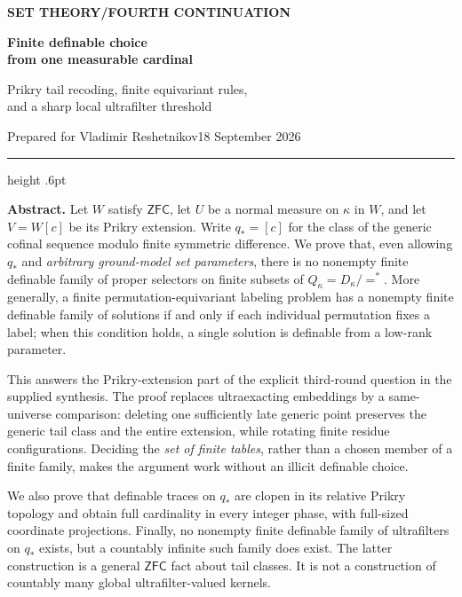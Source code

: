\documentclass[11pt,letterpaper]{article}
\theoremstyle{definition}
\numberwithin{equation}{section}
\newcommand{\ZFC}{\mathsf{ZFC}}
\begin{document}
\thispagestyle{empty}
{\sffamily\bfseries\small\color{Olive}SET THEORY\quad /\quad FOURTH CONTINUATION}

\vspace{13pt}
{\fontsize{28}{31}\selectfont\bfseries\color{Forest}Finite definable choice\\from one measurable cardinal\par}
\vspace{10pt}
{\fontsize{14}{18}\selectfont Prikry tail recoding, finite equivariant rules,\\and a sharp local ultrafilter threshold\par}
\vspace{14pt}
{\color{Muted}Prepared for Vladimir Reshetnikov\hfill 18 September 2026\par}
\vspace{3pt}
{\color{Sage}\hrule height .6pt}
\vspace{12pt}

\textbf{Abstract.}
Let $W$ satisfy $\ZFC$, let $U$ be a normal measure on $\kappa$ in $W$, and let
$V=W[c]$ be its Prikry extension. Write $q_*=[c]$ for the class of the generic
cofinal sequence modulo finite symmetric difference. We prove that, even allowing
$q_*$ and \emph{arbitrary ground-model set parameters}, there is no nonempty
finite definable family of proper selectors on finite subsets of
$Q_\kappa=D_\kappa/{=^*}$. More generally, a finite permutation-equivariant
labeling problem has a nonempty finite definable family of solutions if and
only if each individual permutation fixes a label; when this condition holds,
a single solution is definable from a low-rank parameter.

This answers the Prikry-extension part of the explicit third-round question
in the supplied synthesis. The proof replaces ultraexacting embeddings by a
same-universe comparison: deleting one sufficiently late generic point
preserves the generic tail class and the entire extension, while rotating
finite residue configurations. Deciding the \emph{set of finite tables},
rather than a chosen member of a finite family, makes the argument work
without an illicit definable choice.

We also prove that definable traces on $q_*$ are clopen in its relative Prikry
topology and obtain full cardinality in every integer phase, with full-sized
coordinate projections. Finally, no nonempty finite definable family of
ultrafilters on $q_*$ exists, but a countably infinite such family does exist.
The latter construction is a general $\ZFC$ fact about tail classes. It is
not a construction of countably many global ultrafilter-valued kernels.
\end{document}
